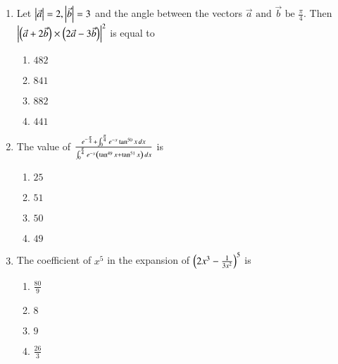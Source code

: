 \documentclass[journal]{IEEEtran}
\theoremstyle{remark}
\begin{document}
\begin{enumerate}
\item Let $\left\vert\Vec{a}\right\vert=2,\left\vert\Vec{b}\right\vert=3$ and the angle between the vectors $\Vec{a} \text{ and } \Vec{b} \text{ be } \frac{\pi}{4}$. Then ${\left\vert\left(\Vec{a}+2\Vec{b}\right)\times\left(2\Vec{a}-3\Vec{b}\right)\right\vert}^2$ is equal to\hfill{}

\begin{multicols}{4}
\begin{enumerate}
\item $482$
\item $841$
\item $882$
\item $441$
\end{enumerate}
\end{multicols}

\item The value of $\frac{e^{-\frac{\pi}{4}} + \int_0^{\frac{\pi}{4}} e^{-x} \tan^{50}x \, dx}{\int_0^{\frac{\pi}{4}} e^{-x} \left( \tan^{49}x + \tan^{51}x \right) \, dx}$ is\hfill{}

\begin{multicols}{4}
\begin{enumerate}
\item $25$
\item $51$
\item $50$
\item $49$
\end{enumerate}
\end{multicols}

\item The coefficient of $x^5$ in the expansion of ${\left(2x^3-\frac{1}{3x^2}\right)}^5$ is\hfill{}

\begin{multicols}{4}
\begin{enumerate}
\item $\frac{80}{9}$
\item $8$
\item $9$
\item $\frac{26}{3}$
\end{enumerate}
\end{multicols}



\end{enumerate}
\end{document}
